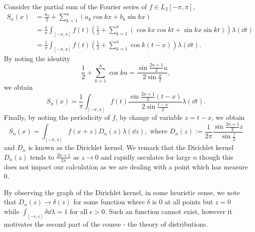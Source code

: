 \documentclass[]{article}
\theoremstyle{definition}
\theoremstyle{definition}
\begin{document}
Consider the partial sum of the Fourier series of \(f \in L_2[-\pi, \pi]\),
\[\begin{split}
  S_n(x) & = \frac{a_0}{2} + \sum_{k = 1}^n (a_k \cos kx + b_k \sin kx)\\
  & = \frac{1}{\pi}{\int_{[-\pi, \pi]} f(t)}\left(\frac{1}{2} + \sum_{k = 1}^n 
    (\cos kx \cos kt + \sin kx \sin kt)\right)\lambda(\dd t)\\
  & = \frac{1}{\pi}{\int_{[-\pi, \pi]} f(t)}\left(\frac{1}{2} + \sum_{k = 1}^n 
  \cos k(t - x)\right)\lambda(\dd t).
\end{split}\]
By noting the identity
\[\frac{1}{2} + \sum_{k = 1}^n \cos ku = \frac{\sin \frac{2n + 1}{2}u}{2\sin \frac{u}{2}},\]
we obtain 
\[S_n(x) = \frac{1}{\pi}{\int_{[-\pi, \pi]} f(t)} 
  \frac{\sin \frac{2n + 1}{2}(t - x)}{2\sin \frac{t - x}{2}} \lambda(\dd t).\]
Finally, by noting the periodicity of \(f\), by change of variable \(z = t - x\),
we obtain 
\[S_n(x) = \int_{[-\pi, \pi]} f(x + z) D_n(z) \lambda(\dd z), \text{ where }
  D_n(z) := \frac{1}{2\pi} \frac{\sin \frac{2n + 1}{2}z}{\sin \frac{z}{2}}\]
and \(D_n\) is known as the Dirichlet kernel. We remark that the Dirichlet kernel 
\(D_n(z)\) tends to \(\frac{2n + 1}{2\pi}\) as \(z \to 0\) and rapidly osculates 
for large \(n\) though this does not impact our calculation as we are dealing 
with a point which has measure 0. 

\begin{center}
\end{center}

By observing the graph of the Dirichlet kernel, in some heuristic sense, we note that 
\(D_n(z) \to \delta(z)\) for some function where \(\delta\) is 0 at all points but 
\(z = 0\) while \(\int_{[-\epsilon, \epsilon]} \delta \dd \lambda = 1\) for all 
\(\epsilon > 0\). Such an function cannot exist, however it motivates the second 
part of the course - the theory of distributions.
\end{document}
